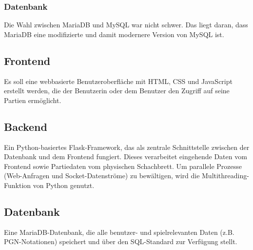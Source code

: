 \subsubsection{Datenbank}
Die Wahl zwischen MariaDB und MySQL war nicht schwer. Das liegt daran, dass MariaDB eine 
modifizierte und damit modernere Version von MySQL ist. 

\subsection{Frontend}
Es soll eine webbasierte Benutzeroberfläche mit HTML, CSS und JavaScript erstellt werden, 
die der Benutzerin oder dem Benutzer den Zugriff auf seine Partien ermöglicht.

\subsection{Backend}
Ein Python-basiertes Flask-Framework, das als zentrale Schnittstelle zwischen der Datenbank und 
dem Frontend fungiert. Dieses verarbeitet eingehende Daten vom Frontend sowie Partiedaten vom 
physischen Schachbrett. Um parallele Prozesse (Web-Anfragen und Socket-Datenströme) zu bewältigen, 
wird die Multithreading-Funktion von Python genutzt.

\subsection{Datenbank}
Eine MariaDB-Datenbank, die alle benutzer- und spielrelevanten Daten (z.B. PGN-Notationen) 
speichert und über den SQL-Standard zur Verfügung stellt. 
